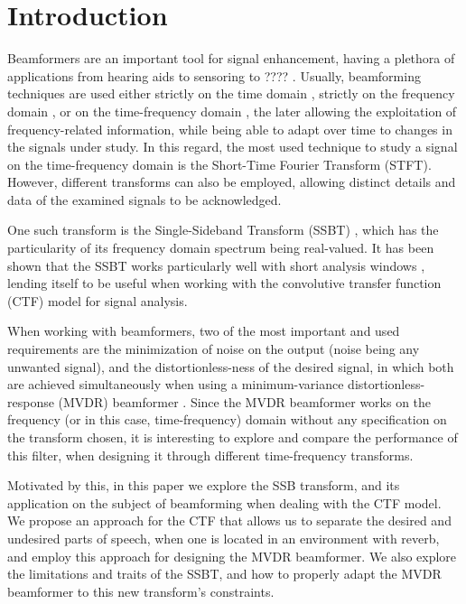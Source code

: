 \section{Introduction}
\label{sec:introduction}

Beamformers are an important tool for signal enhancement, having a plethora of applications from hearing aids \cite{hearing-aids} to sensoring \cite{sensoring} to ???? \cite{???}. Usually, beamforming techniques are used either strictly on the time domain \cite{bf-time-domain}, strictly on the frequency domain \cite{bf-freq-domain}, or on the time-frequency domain \cite{bf-tf-domain}, the later allowing the exploitation of frequency-related information, while being able to adapt over time to changes in the signals under study. In this regard, the most used technique to study a signal on the time-frequency domain is the Short-Time Fourier Transform (STFT). However, different transforms can also be employed, allowing distinct details and data of the examined signals to be acknowledged.

One such transform is the Single-Sideband Transform (SSBT) \cite{ssbt}, which has the particularity of its frequency domain spectrum being real-valued. It has been shown that the SSBT works particularly well with short analysis windows \cite{ssbt-short-windows}, lending itself to be useful when working with the convolutive transfer function (CTF) model \cite{ctf} for signal analysis.

When working with beamformers, two of the most important and used requirements are the minimization of noise on the output (noise being any unwanted signal), and the distortionless-ness of the desired signal, in which both are achieved simultaneously when using a minimum-variance distortionless-response (MVDR) beamformer \cite{mvdr}. Since the MVDR beamformer works on the frequency (or in this case, time-frequency) domain without any specification on the transform chosen, it is interesting to explore and compare the performance of this filter, when designing it through different time-frequency transforms.

Motivated by this, in this paper we explore the SSB transform, and its application on the subject of beamforming when dealing with the CTF model. We propose an approach for the CTF that allows us to separate the desired and undesired parts of speech, when one is located in an environment with reverb, and employ this approach for designing the MVDR beamformer. We also explore the limitations and traits of the SSBT, and how to properly adapt the MVDR beamformer to this new transform's constraints.


